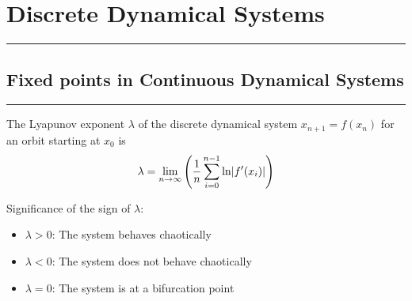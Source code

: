\section{Discrete Dynamical Systems}
\noindent\rule[\linienAbstand]{\linewidth}{\linienDickeDick}

\subsection{Fixed points in Continuous Dynamical Systems}
\noindent\rule[\linienAbstand]{\linewidth}{\linienDicke}
The Lyapunov exponent $\lambda$ of the discrete dynamical system $x_{n+1} = f(x_n)$ for an orbit starting at $x_0$ is
\begin{equation}
  \lambda = \lim_{n \to \infty}\left(\frac{1}{n} \sum_{i=0}^{n-1} \textup{ln}|f'(x_i)|\right)
\end{equation}

Significance of the sign of $\lambda$:
\begin{itemize}
  \item $\lambda > 0$: The system behaves chaotically
  \item $\lambda < 0$: The system does not behave chaotically
  \item $\lambda = 0$: The system is at a bifurcation point
\end{itemize}
